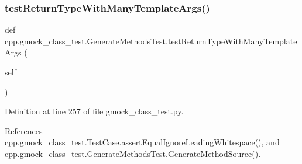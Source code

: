 \subsubsection{\texorpdfstring{test\+Return\+Type\+With\+Many\+Template\+Args()}{testReturnTypeWithManyTemplateArgs()}}
{\footnotesize\ttfamily def cpp.\+gmock\+\_\+class\+\_\+test.\+Generate\+Methods\+Test.\+test\+Return\+Type\+With\+Many\+Template\+Args (\begin{DoxyParamCaption}\item[{}]{self }\end{DoxyParamCaption})}



Definition at line 257 of file gmock\+\_\+class\+\_\+test.\+py.



References cpp.\+gmock\+\_\+class\+\_\+test.\+Test\+Case.\+assert\+Equal\+Ignore\+Leading\+Whitespace(), and cpp.\+gmock\+\_\+class\+\_\+test.\+Generate\+Methods\+Test.\+Generate\+Method\+Source().


